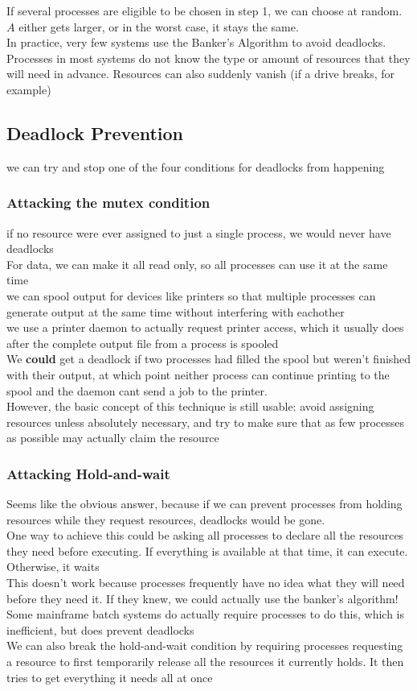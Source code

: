 \documentclass{article}
\begin{document}
If several processes are eligible to be chosen in step 1, we can choose at random. $A$ either gets larger, or in the worst case, it stays the same.
\\In practice, very few systems use the Banker's Algorithm to avoid deadlocks. Processes in most systems do not know the type or amount of resources that they will need in advance. Resources can also suddenly vanish (if a drive breaks, for example)
\subsection*{Deadlock Prevention} 
we can try and stop one of the four conditions for deadlocks from happening
\subsubsection*{Attacking the mutex condition}
if no resource were ever assigned to just a single process, we would never have deadlocks
\\For data, we can make it all read only, so all processes can use it at the same time
\\we can spool output for devices like printers so that multiple processes can generate output at the same time without interfering with eachother
\\we use a printer daemon to actually request printer access, which it usually does after the complete output file from a process is spooled
\\We \textbf{could} get a deadlock if two processes had filled the spool but weren't finished with their output, at which point neither process can continue printing to the spool and the daemon cant send a job to the printer.
\\However, the basic concept of this technique is still usable: avoid assigning resources unless absolutely necessary, and try to make sure that as few processes as possible may actually claim the resource
\subsubsection*{Attacking Hold-and-wait}
Seems like the obvious answer, because if we can prevent processes from holding resources while they request resources, deadlocks would be gone.
\\One way to achieve this could be asking all processes to declare all the resources they need before executing. If everything is available at that time, it can execute. Otherwise, it waits
\\This doesn't work because processes frequently have no idea what they will need before they need it. If they knew, we could actually use the banker's algorithm!
\\Some mainframe batch systems do actually require processes to do this, which is inefficient, but does prevent deadlocks
\\We can also break the hold-and-wait condition by requiring processes requesting a resource to first temporarily release all the resources it currently holds. It then tries to get everything it needs all at once
\end{document}
